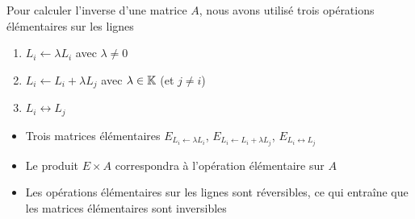 \begin{frame}

Pour calculer l'inverse d'une matrice $A$, nous avons utilisé trois opérations
 élémentaires sur les lignes
\pause
\begin{enumerate}
  \item $L_i \leftarrow \lambda L_i$ avec $\lambda \neq 0$
   
  \item $L_i \leftarrow L_i+\lambda L_j$ avec $\lambda \in \mathbb{K}$ (et $j\neq i$)

  \item $L_i \leftrightarrow L_j$
\end{enumerate}

\bigskip
\pause

\begin{itemize}
  \item Trois matrices élémentaires 
$E_{L_i \leftarrow \lambda L_i}$, $E_{L_i \leftarrow L_i+\lambda L_j}$, 
$E_{L_i \leftrightarrow L_j}$ 

\pause

  \item Le produit $E\times A$ correspondra à l'opération élémentaire sur $A$
  
\pause  

  \item Les opérations élémentaires sur les lignes sont réversibles,
ce qui entraîne que les matrices élémentaires sont inversibles 
%   
%   
\end{itemize}

\end{frame}


